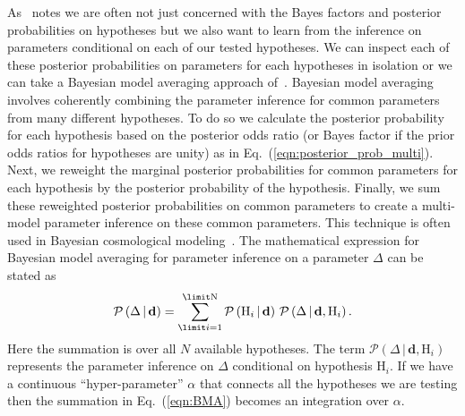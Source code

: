 As~\cite{read2006encyclopedia} notes we are often not just concerned with the Bayes factors and posterior probabilities on hypotheses but we also want to learn from the inference on parameters conditional on each of our tested hypotheses. We can inspect each of these posterior probabilities on parameters for each hypotheses in isolation or we can take a Bayesian model averaging approach of~\cite{kass1995bayes}. Bayesian model averaging involves coherently combining the parameter inference for common parameters from many different hypotheses. To do so we calculate the posterior probability for each hypothesis based on the posterior odds ratio (or Bayes factor if the prior odds ratios for hypotheses are unity) as in Eq.~(\ref{eqn:posterior_prob_multi}). Next, we reweight the marginal posterior probabilities for common parameters for each hypothesis by the posterior probability of the hypothesis. Finally, we sum these reweighted posterior probabilities on common parameters to create a multi-model parameter inference on these common parameters. This technique is often used in Bayesian cosmological modeling~\cite{hobson2010bayesian}. The mathematical expression for Bayesian model averaging for parameter inference on a parameter $\Delta$ can be stated as
\begin{equation}\label{eqn:BMA}
    \mathcal{P} \left( \Delta \, | \, \mathbf{d}\right) = \sum_{\limit i=1}^{\limit \mathrm{N}}  \mathcal{P} \left(\mathrm{H}_i \, | \, \mathbf{d}\right) \,  \mathcal{P} \left(\Delta \, | \, \mathbf{d}, \mathrm{H}_i\right).
\end{equation}
Here the summation is over all $N$ available hypotheses. The term $\mathcal{P} \left(\Delta \, | \, \mathbf{d}, \mathrm{H}_i\right)$ represents the parameter inference on $\Delta$ conditional on hypothesis $\mathrm{H}_i$. If we have a continuous ``hyper-parameter'' $\alpha$ that connects all the hypotheses we are testing then the summation in Eq.~(\ref{eqn:BMA}) becomes an integration over $\alpha$. 

